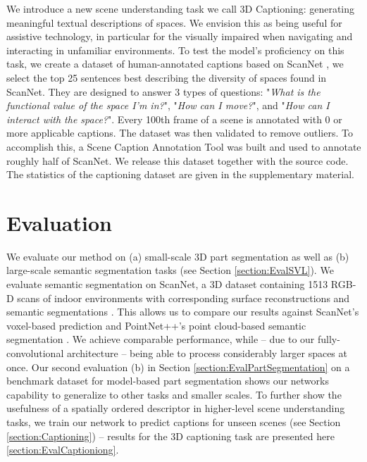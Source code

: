 \documentclass[runningheads]{llncs}
\begin{document}
We introduce a new scene understanding task we call 3D Captioning: generating meaningful textual descriptions of spaces. We envision this as being useful for assistive technology, in particular for the visually impaired when navigating and interacting in unfamiliar environments. To test the model's proficiency on this task, we create a dataset of human-annotated captions based on ScanNet \cite{Dai2017}, we select the top 25 sentences best describing the diversity of spaces found in ScanNet. They are designed to answer 3 types of questions: "\textit{What is the functional value of the space I'm in?}", "\textit{How can I move?}", and "\textit{How can I interact with the space?}". Every 100th frame of a scene is annotated with 0 or more applicable captions. The dataset was then validated to remove outliers. To accomplish this, a Scene Caption Annotation Tool was built and used to annotate roughly half of ScanNet. We release this dataset together with the source code. The statistics of the captioning dataset are given in the supplementary material. %

\section{Evaluation}





We evaluate our method on (a) small-scale 3D part segmentation as well as (b) large-scale semantic segmentation tasks (see Section \ref{section:EvalSVL}). We evaluate semantic segmentation on ScanNet, a 3D dataset containing 1513 RGB-D scans of indoor environments with corresponding surface reconstructions and semantic segmentations \cite{Dai2017}. This allows us to compare our results against ScanNet's voxel-based prediction \cite{Dai2017} and PointNet++'s point cloud-based semantic segmentation \cite{Qi2017_2}. We achieve comparable performance, while -- due to our fully-convolutional architecture -- being able to process considerably larger spaces at once. Our second evaluation (b) in Section \ref{section:EvalPartSegmentation} on a benchmark dataset for model-based part segmentation shows our networks capability to generalize to other tasks and smaller scales. To further show the usefulness of a spatially ordered descriptor in higher-level scene understanding tasks, we train our network to predict captions for unseen scenes (see Section \ref{section:Captioning}) -- results for the 3D captioning task are presented here \ref{section:EvalCaptioniong}. %
\end{document}
